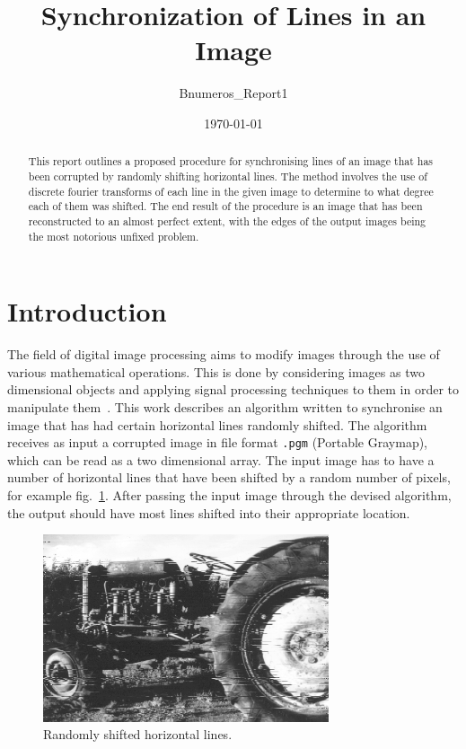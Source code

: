 \documentclass[a4paper,12pt]{article}
\title{Synchronization of Lines in an Image}
\author{Bnumeros\_Report1}
\date{\today}
\begin{document}
\maketitle

\begin{abstract}
 This report outlines a proposed procedure for synchronising lines of an image that has been corrupted by randomly shifting horizontal lines. The method involves the use of discrete fourier transforms of each line in the given image to determine to what degree each of them was shifted. The end result of the procedure is an image that has been reconstructed to an almost perfect extent, with the edges of the output images being the most notorious unfixed problem.
\end{abstract}

\section{Introduction}

The field of digital image processing aims to modify images through the use of various mathematical operations. This is done by considering images as two dimensional objects and applying signal processing techniques to them in order to manipulate them~\cite{gonzalez1992digital}. This work describes an algorithm written to synchronise an image that has had certain horizontal lines randomly shifted. The algorithm receives as input a corrupted image in file format \texttt{.pgm} (Portable Graymap), which can be read as a two dimensional array. The input image has to have a number of horizontal lines that have been shifted by a random number of pixels, for example fig.~\ref{fig.1}. After passing the input image through the devised algorithm, the output should have most lines shifted into their appropriate location.

\begin{figure}[h!]
\centering
\includegraphics[width=0.75\textwidth]{img/desync2}
\caption{Randomly shifted horizontal lines.}
\label{fig.1}
\end{figure}
\end{document}
